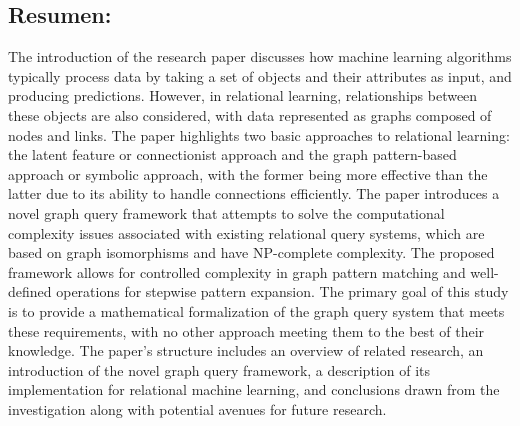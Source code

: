 \documentclass{article}%
\begin{document}
\subsection{Resumen:}%
\label{subsec:Resumen}%
The introduction of the research paper discusses how machine learning algorithms typically process data by taking a set of objects and their attributes as input, and producing predictions. However, in relational learning, relationships between these objects are also considered, with data represented as graphs composed of nodes and links. The paper highlights two basic approaches to relational learning: the latent feature or connectionist approach and the graph pattern{-}based approach or symbolic approach, with the former being more effective than the latter due to its ability to handle connections efficiently.\newline%
\newline%
The paper introduces a novel graph query framework that attempts to solve the computational complexity issues associated with existing relational query systems, which are based on graph isomorphisms and have NP{-}complete complexity. The proposed framework allows for controlled complexity in graph pattern matching and well{-}defined operations for stepwise pattern expansion. The primary goal of this study is to provide a mathematical formalization of the graph query system that meets these requirements, with no other approach meeting them to the best of their knowledge.\newline%
\newline%
The paper's structure includes an overview of related research, an introduction of the novel graph query framework, a description of its implementation for relational machine learning, and conclusions drawn from the investigation along with potential avenues for future research.

%
\end{document}
